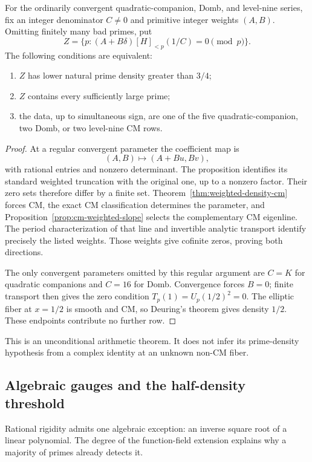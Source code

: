 \begin{theorem}
\label{thm:additional-raw-density}
For the ordinarily convergent quadratic-companion, Domb, and
level-nine series, fix an integer denominator $C\ne0$ and primitive
integer weights $(A,B)$. Omitting finitely many bad primes, put
\[
 Z=\{p:(A+B\delta)[H]_{<p}(1/C)=0\pmod p\}.
\]
The following conditions are equivalent:
\begin{enumerate}
\item $Z$ has lower natural prime density greater than $3/4$;
\item $Z$ contains every sufficiently large prime;
\item the data, up to simultaneous sign, are one of the five
quadratic-companion, two Domb, or two level-nine CM rows.
\end{enumerate}
\end{theorem}
\begin{proof}
At a regular convergent parameter the coefficient map is
\[
                 (A,B)\longmapsto(A+Bu,Bv),
\]
with rational entries and nonzero determinant. The proposition
identifies its standard weighted truncation with the original one,
up to a nonzero factor. Their zero sets therefore differ by a finite
set. Theorem~\ref{thm:weighted-density-cm} forces CM, the exact CM
classification determines the parameter, and
Proposition~\ref{prop:cm-weighted-slope} selects the complementary CM
eigenline. The period characterization of that line and invertible
analytic transport identify precisely the listed weights. Those
weights give cofinite zeros, proving both directions.

The only convergent parameters omitted by this regular argument are
$C=K$ for quadratic companions and $C=16$ for Domb. Convergence
forces $B=0$; finite transport then gives the zero condition
$T_p(1)=U_p(1/2)^2=0$. The elliptic fiber at $x=1/2$ is smooth and
CM, so Deuring's theorem gives density $1/2$. These endpoints
contribute no further row.
\end{proof}
This is an unconditional arithmetic theorem. It does not infer its
prime-density hypothesis from a complex identity at an unknown
non-CM fiber.

\subsection{Algebraic gauges and the half-density threshold}
\label{subsec:C-majority-lucas-gauges}
Rational rigidity admits one algebraic exception: an inverse square
root of a linear polynomial. The degree of the function-field
extension explains why a majority of primes already detects it.

